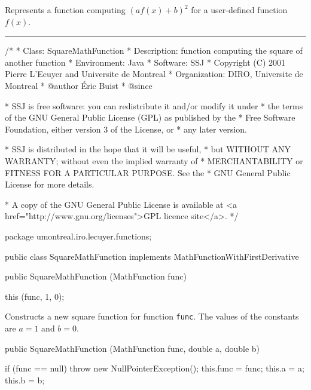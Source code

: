 
Represents a function computing
$(af(x) + b)^2$ for a user-defined function
$f(x)$.

\bigskip\hrule

\begin{code}
\begin{hide}
/*
 * Class:        SquareMathFunction
 * Description:  function computing the square of another function
 * Environment:  Java
 * Software:     SSJ 
 * Copyright (C) 2001  Pierre L'Ecuyer and Universite de Montreal
 * Organization: DIRO, Universite de Montreal
 * @author       Éric Buist
 * @since

 * SSJ is free software: you can redistribute it and/or modify it under
 * the terms of the GNU General Public License (GPL) as published by the
 * Free Software Foundation, either version 3 of the License, or
 * any later version.

 * SSJ is distributed in the hope that it will be useful,
 * but WITHOUT ANY WARRANTY; without even the implied warranty of
 * MERCHANTABILITY or FITNESS FOR A PARTICULAR PURPOSE.  See the
 * GNU General Public License for more details.

 * A copy of the GNU General Public License is available at
   <a href="http://www.gnu.org/licenses">GPL licence site</a>.
 */
\end{hide}
package umontreal.iro.lecuyer.functions;\begin{hide}

\end{hide}

public class SquareMathFunction implements MathFunctionWithFirstDerivative \begin{hide} {
   private MathFunction func;
   private double a, b;
\end{hide}

   public SquareMathFunction (MathFunction func)\begin{hide} {
      this (func, 1, 0);
   }\end{hide}
\end{code}
\begin{tabb}   Constructs a new square function
 for function \texttt{func}.
 The values of the constants are
 $a=1$ and $b=0$.
\end{tabb}
\begin{htmlonly}
\end{htmlonly}
\begin{code}

   public SquareMathFunction (MathFunction func, double a, double b)\begin{hide} {
      if (func == null)
         throw new NullPointerException();
      this.func = func;
      this.a = a;
      this.b = b;
   }\end{hide}
\end{code}
